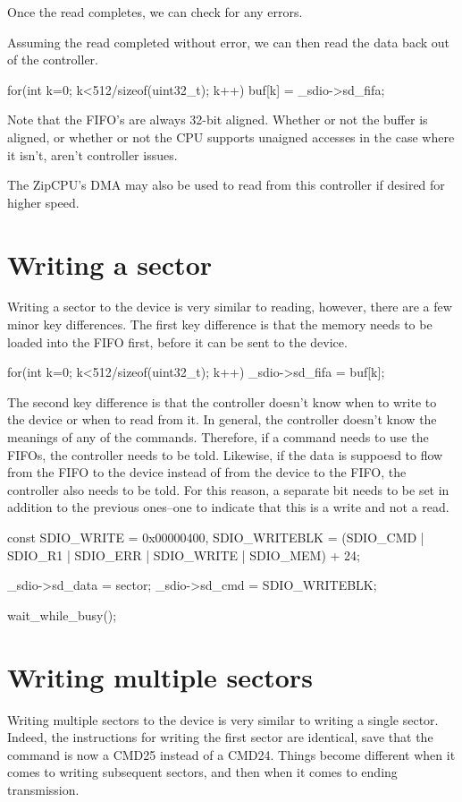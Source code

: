 \documentclass{gqtekspec}
\begin{document}
Once the read completes, we can check for any errors.

Assuming the read completed without error, we can then read the data back
out of the controller.

\begin{CPP}
	for(int k=0; k<512/sizeof(uint32_t); k++)
		buf[k] = _sdio->sd_fifa;
\end{CPP}

Note that the FIFO's are always 32-bit aligned.  Whether or not the buffer
is aligned, or whether or not the CPU supports unaigned accesses in the
case where it isn't, aren't controller issues.

The ZipCPU's DMA may also be used to read from this controller if desired
for higher speed.
\section{Writing a sector}
Writing a sector to the device is very similar to reading, however, there
are a few minor key differences.  The first key difference is that the memory
needs to be loaded into the FIFO first, before it can be sent to the device.
\begin{CPP}
	for(int k=0; k<512/sizeof(uint32_t); k++)
		_sdio->sd_fifa = buf[k];
\end{CPP}

The second key difference is that the controller doesn't know when to write
to the device or when to read from it.  In general, the controller doesn't
know the meanings of any of the commands.  Therefore, if a command needs to
use the FIFOs, the controller needs to be told.  Likewise, if the data is
suppoesd to flow from the FIFO to the device instead of from the device to
the FIFO, the controller also needs to be told.  For this reason, a separate
bit needs to be set in addition to the previous ones--one to indicate that
this is a write and not a read.

\begin{CPP}
	const	SDIO_WRITE    = 0x00000400,
		SDIO_WRITEBLK = (SDIO_CMD | SDIO_R1 | SDIO_ERR
				| SDIO_WRITE | SDIO_MEM) + 24;

	_sdio->sd_data = sector;
	_sdio->sd_cmd  = SDIO_WRITEBLK;

	wait_while_busy();
\end{CPP}
\section{Writing multiple sectors}
Writing multiple sectors to the device is very similar to writing a single
sector.  Indeed, the instructions for writing the first sector are identical,
save that the command is now a CMD25 instead of a CMD24.  Things become
different when it comes to writing subsequent sectors, and then when it comes
to ending transmission.
\end{document}
